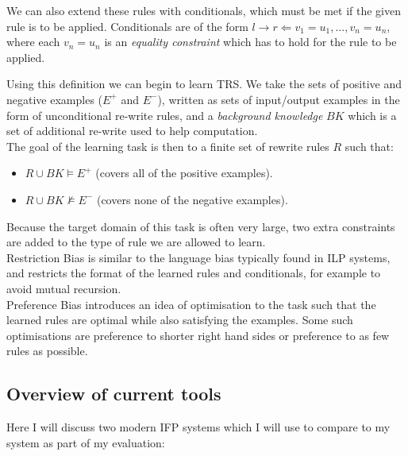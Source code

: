 We can also extend these rules with conditionals, which must be met if the given rule is to be applied. Conditionals are of the form $l \rightarrow r \Leftarrow v_1 = u_1, \dots, v_n = u_n$, where each $v_n = u_n$ is an \textit{equality constraint} which has to hold for the rule to be applied.

Using this definition we can begin to learn TRS. We take the sets of positive and negative examples ($E^+$ and $E^-$), written as sets of input/output examples in the form of unconditional re-write rules, and a \textit{background knowledge} $BK$ which is a set of additional re-write used to help computation. \\

The goal of the learning task is then to a finite set of rewrite rules $R$ such that:

\begin{itemize}
\item $R \cup BK \models E^+$ (covers all of the positive examples).
\item $R \cup BK \not \models E^-$ (covers none of the negative examples).
\end{itemize}

Because the target domain of this task is often very large, two extra constraints are added to the type of rule we are allowed to learn.\\
Restriction Bias is similar to the language bias typically found in ILP systems, and restricts the format of the learned rules and conditionals, for example to avoid mutual recursion. \\
Preference Bias introduces an idea of optimisation to the task such that the learned rules are optimal while also satisfying the examples. Some such optimisations are preference to shorter right hand sides or preference to as few rules as possible.

\subsection{Overview of current tools}

Here I will discuss two modern IFP systems which I will use to compare to my system as part of my evaluation:

